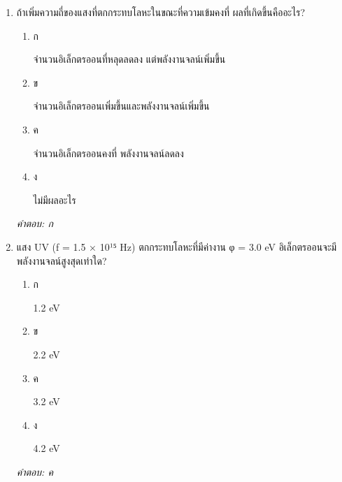 \documentclass[12pt]{article}
\begin{document}
\begin{enumerate}[label=\arabic*., itemsep=0.5\baselineskip, topsep=0.5\baselineskip, leftmargin=*]
\item ถ้าเพิ่มความถี่ของแสงที่ตกกระทบโลหะในขณะที่ความเข้มคงที่ ผลที่เกิดขึ้นคืออะไร?
\begin{enumerate}[label=\alph*)., itemsep=0.3\baselineskip, topsep=0.3\baselineskip]
\item ก\ 
\begin{minipage}[t]{0.9\linewidth}
\raggedright จำนวนอิเล็กตรออนที่หลุดลดลง แต่พลังงานจลน์เพิ่มขึ้น
\end{minipage}
\item ข\ 
\begin{minipage}[t]{0.9\linewidth}
\raggedright จำนวนอิเล็กตรออนเพิ่มขึ้นและพลังงานจลน์เพิ่มขึ้น
\end{minipage}
\item ค\ 
\begin{minipage}[t]{0.9\linewidth}
\raggedright จำนวนอิเล็กตรออนคงที่ พลังงานจลน์ลดลง
\end{minipage}
\item ง\ 
\begin{minipage}[t]{0.9\linewidth}
\raggedright ไม่มีผลอะไร
\end{minipage}
\end{enumerate}
\vspace{-0.3\baselineskip}
\begin{small}
\textit{คำตอบ: ก}
\end{small}

\item แสง UV (f = 1.5 × 10¹⁵ Hz) ตกกระทบโลหะที่มีค่างาน φ = 3.0 eV อิเล็กตรออนจะมีพลังงานจลน์สูงสุดเท่าใด?
\begin{enumerate}[label=\alph*)., itemsep=0.3\baselineskip, topsep=0.3\baselineskip]
\item ก\ 
\begin{minipage}[t]{0.9\linewidth}
\raggedright 1.2 eV
\end{minipage}
\item ข\ 
\begin{minipage}[t]{0.9\linewidth}
\raggedright 2.2 eV
\end{minipage}
\item ค\ 
\begin{minipage}[t]{0.9\linewidth}
\raggedright 3.2 eV
\end{minipage}
\item ง\ 
\begin{minipage}[t]{0.9\linewidth}
\raggedright 4.2 eV
\end{minipage}
\end{enumerate}
\vspace{-0.3\baselineskip}
\begin{small}
\textit{คำตอบ: ค}
\end{small}


\end{enumerate}
\end{document}
